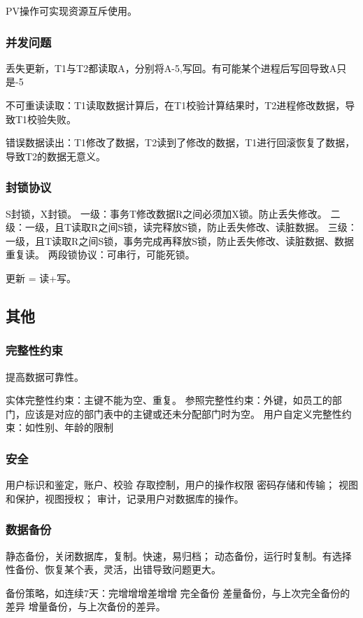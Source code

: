\documentclass[UTF8]{../computerUniverse}
\begin{document}
PV操作可实现资源互斥使用。

\subsubsection{并发问题}

丢失更新，T1与T2都读取A，分别将A-5,写回。有可能某个进程后写回导致A只是-5

不可重读读取：T1读取数据计算后，在T1校验计算结果时，T2进程修改数据，导致T1校验失败。

错误数据读出：T1修改了数据，T2读到了修改的数据，T1进行回滚恢复了数据，导致T2的数据无意义。

\subsubsection{封锁协议}
S封锁，X封锁。
一级：事务T修改数据R之间必须加X锁。防止丢失修改。
二级：一级，且T读取R之间S锁，读完释放S锁，防止丢失修改、读脏数据。
三级：一级，且T读取R之间S锁，事务完成再释放S锁，防止丢失修改、读脏数据、数据重复读。
两段锁协议：可串行，可能死锁。

更新 = 读+写。

\subsection{其他}
\subsubsection{完整性约束}
提高数据可靠性。

实体完整性约束：主键不能为空、重复。
参照完整性约束：外键，如员工的部门，应该是对应的部门表中的主键或还未分配部门时为空。
用户自定义完整性约束：如性别、年龄的限制

\subsubsection{安全}
用户标识和鉴定，账户、校验
存取控制，用户的操作权限
密码存储和传输；
视图和保护，视图授权；
审计，记录用户对数据库的操作。

\subsubsection{数据备份}
静态备份，关闭数据库，复制。快速，易归档；
动态备份，运行时复制。有选择性备份、恢复某个表，灵活，出错导致问题更大。

备份策略，如连续7天：完增增增差增增
完全备份
差量备份，与上次完全备份的差异
增量备份，与上次备份的差异。
\end{document}
